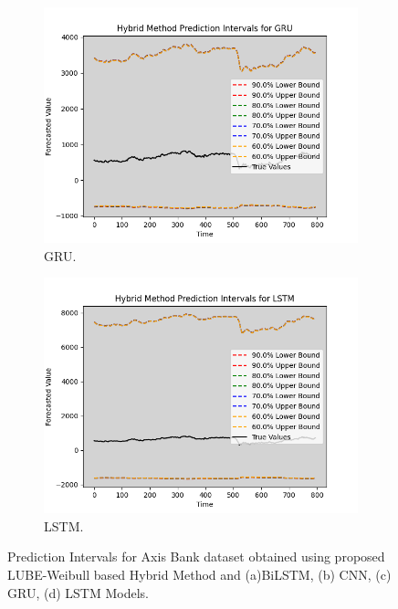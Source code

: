 \begin{figure}[H]
\begin{minipage}{0.45\textwidth}
        \begin{subfigure}[b]{\textwidth}
            \centering
            \includegraphics[width=\textwidth]{Chap03/figs/GRU_hybrid_method_plot_AxisBank_Method2.png}
            \caption{GRU.}
        \end{subfigure}
        \begin{subfigure}[b]{\textwidth}
            \centering
            \includegraphics[width=\textwidth]{Chap03/figs/LSTM_hybrid_method_plot_AxisBank_Method2.png}
            \caption{LSTM.}
        \end{subfigure}
        \caption{Prediction Intervals for Axis Bank dataset obtained using proposed LUBE-Weibull based Hybrid Method and (a)BiLSTM, (b) CNN, (c) GRU, (d) LSTM Models.}

\end{minipage}
\end{figure}

